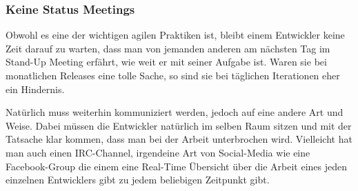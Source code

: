 \subsubsection{Keine Status Meetings}
Obwohl es eine der wichtigen agilen Praktiken ist, bleibt einem Entwickler
keine Zeit darauf zu warten, dass man von jemanden anderen am nächsten Tag im
Stand-Up Meeting erfährt, wie weit er mit seiner Aufgabe ist. Waren sie bei
monatlichen Releases eine tolle Sache, so sind sie bei täglichen Iterationen
eher ein Hindernis.

Natürlich muss weiterhin kommuniziert werden, jedoch auf eine andere Art und
Weise. Dabei müssen die Entwickler natürlich im selben Raum sitzen und mit der
Tatsache klar kommen, dass man bei der Arbeit unterbrochen wird. Vielleicht
hat man auch einen IRC-Channel, irgendeine Art von Social-Media wie eine
Facebook-Group die einem eine Real-Time Übersicht über die Arbeit eines jeden
einzelnen Entwicklers gibt zu jedem beliebigen Zeitpunkt gibt.
